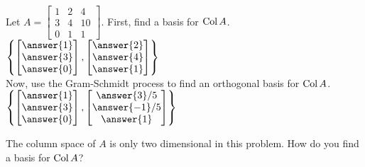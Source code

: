 \documentclass{ximera}
\newcommand{\Col}{\mathop{\rm Col}}
\begin{document}
  	  		                      \begin{question} 
  	  		                       Let $A = \begin{bmatrix} 1&2&4\\ 3&4&10\\ 0&1&1\end{bmatrix}$. First, find a basis for $\Col A$.\vspace{10pt}\\
  	  		                      	
  	  		                      	$\left\{   \begin{bmatrix} \answer{1}\\\answer{3}\\\answer{0}\end{bmatrix},  
  	  		                      	\begin{bmatrix} \answer{2}\\\answer{4}\\\answer{1}\end{bmatrix}
  	  		                                       \right\}$\vspace{10pt}\\
  	  		                      	
  	  		                      	
  	  		                      	Now, use the Gram-Schmidt process to find an orthogonal basis for $\Col A$.\\
  	  		                      	
  	  		                      	$\left\{   \begin{bmatrix} \answer{1}\\\answer{3}\\\answer{0}\end{bmatrix},  
  	  		                      	\begin{bmatrix} \answer{3}/5\\\answer{-1}/5\\\answer{1}\end{bmatrix}\right\}$
  	  		                      	
  	  		                      	\begin{hint}
  	  		                      		
  	  		                      		The column space of $A$ is only two dimensional in this problem. How do you find a basis for $\Col A$?
  	  		                      		\end{hint}
  	  		                      \end{question}
  
\end{document}
